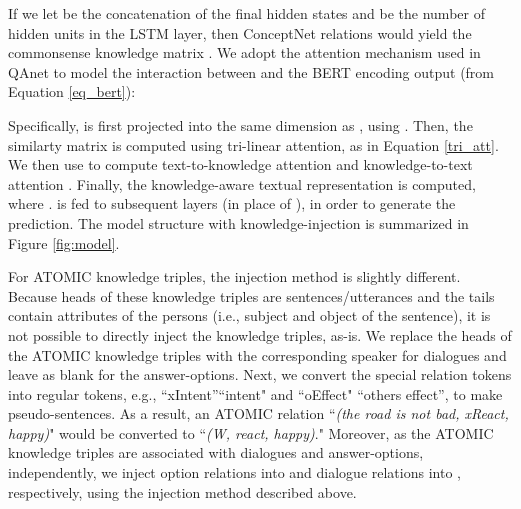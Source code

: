 \documentclass[11pt,a4paper]{article}
\begin{document}
If we let  be the concatenation of the final hidden states and  be the number of hidden units in the LSTM layer, then  ConceptNet relations would yield the commonsense knowledge matrix . We adopt the attention mechanism used in QAnet \cite{46691} to model the interaction between  and the BERT encoding output  (from Equation \ref{eq_bert}): 

Specifically,  is first projected into the same dimension as , using . Then, the similarty matrix  is computed using tri-linear attention, as in Equation \ref{tri_att}. We then use  to compute text-to-knowledge attention  and knowledge-to-text attention . Finally, the knowledge-aware textual representation  is computed, where .  is fed to subsequent layers (in place of ), in order to generate the prediction. The model structure with knowledge-injection is summarized in Figure \ref{fig:model}. 

For ATOMIC knowledge triples, the injection method is slightly different. Because heads of these knowledge triples are sentences/utterances and the tails contain attributes of the persons (i.e., subject and object of the sentence), it is not possible to directly inject the knowledge triples, as-is. We replace the heads of the ATOMIC knowledge triples with the corresponding speaker for dialogues and leave as blank for the answer-options. Next, we convert the special relation tokens into regular tokens, e.g., ``xIntent''``intent" and ``oEffect" ``others effect'', to make pseudo-sentences. As a result, an ATOMIC relation ``\textit{(the road is not bad, xReact, happy)}" would be converted to ``\textit{(W, react, happy)}." Moreover, as the ATOMIC knowledge triples are associated with dialogues and answer-options, independently, we inject option relations into  and dialogue relations into , respectively, using the injection method described above.  

\linespread{0.4}
\end{document}

